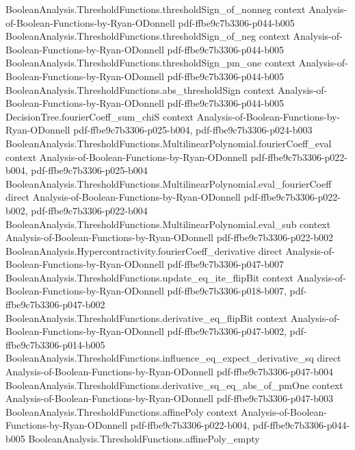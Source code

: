 \begin{theorem}
\proofstep
  {BooleanAnalysis.ThresholdFunctions.thresholdSign_of_nonneg}
  {context}
  {Analysis-of-Boolean-Functions-by-Ryan-ODonnell}
  {pdf-ffbe9c7b3306-p044-b005}
\proofstep
  {BooleanAnalysis.ThresholdFunctions.thresholdSign_of_neg}
  {context}
  {Analysis-of-Boolean-Functions-by-Ryan-ODonnell}
  {pdf-ffbe9c7b3306-p044-b005}
\proofstep
  {BooleanAnalysis.ThresholdFunctions.thresholdSign_pm_one}
  {context}
  {Analysis-of-Boolean-Functions-by-Ryan-ODonnell}
  {pdf-ffbe9c7b3306-p044-b005}
\proofstep
  {BooleanAnalysis.ThresholdFunctions.abs_thresholdSign}
  {context}
  {Analysis-of-Boolean-Functions-by-Ryan-ODonnell}
  {pdf-ffbe9c7b3306-p044-b005}
\proofstep
  {DecisionTree.fourierCoeff_sum_chiS}
  {context}
  {Analysis-of-Boolean-Functions-by-Ryan-ODonnell}
  {pdf-ffbe9c7b3306-p025-b004,
    pdf-ffbe9c7b3306-p024-b003}
\proofstep
  {BooleanAnalysis.ThresholdFunctions.MultilinearPolynomial.fourierCoeff_eval}
  {context}
  {Analysis-of-Boolean-Functions-by-Ryan-ODonnell}
  {pdf-ffbe9c7b3306-p022-b004,
    pdf-ffbe9c7b3306-p025-b004}
\proofstep
  {BooleanAnalysis.ThresholdFunctions.MultilinearPolynomial.eval_fourierCoeff}
  {direct}
  {Analysis-of-Boolean-Functions-by-Ryan-ODonnell}
  {pdf-ffbe9c7b3306-p022-b002,
    pdf-ffbe9c7b3306-p022-b004}
\proofstep
  {BooleanAnalysis.ThresholdFunctions.MultilinearPolynomial.eval_sub}
  {context}
  {Analysis-of-Boolean-Functions-by-Ryan-ODonnell}
  {pdf-ffbe9c7b3306-p022-b002}
\proofstep
  {BooleanAnalysis.Hypercontractivity.fourierCoeff_derivative}
  {direct}
  {Analysis-of-Boolean-Functions-by-Ryan-ODonnell}
  {pdf-ffbe9c7b3306-p047-b007}
\proofstep
  {BooleanAnalysis.ThresholdFunctions.update_eq_ite_flipBit}
  {context}
  {Analysis-of-Boolean-Functions-by-Ryan-ODonnell}
  {pdf-ffbe9c7b3306-p018-b007,
    pdf-ffbe9c7b3306-p047-b002}
\proofstep
  {BooleanAnalysis.ThresholdFunctions.derivative_eq_flipBit}
  {context}
  {Analysis-of-Boolean-Functions-by-Ryan-ODonnell}
  {pdf-ffbe9c7b3306-p047-b002,
    pdf-ffbe9c7b3306-p014-b005}
\proofstep
  {BooleanAnalysis.ThresholdFunctions.influence_eq_expect_derivative_sq}
  {direct}
  {Analysis-of-Boolean-Functions-by-Ryan-ODonnell}
  {pdf-ffbe9c7b3306-p047-b004}
\proofstep
  {BooleanAnalysis.ThresholdFunctions.derivative_sq_eq_abs_of_pmOne}
  {context}
  {Analysis-of-Boolean-Functions-by-Ryan-ODonnell}
  {pdf-ffbe9c7b3306-p047-b003}
\proofstep
  {BooleanAnalysis.ThresholdFunctions.affinePoly}
  {context}
  {Analysis-of-Boolean-Functions-by-Ryan-ODonnell}
  {pdf-ffbe9c7b3306-p022-b004,
    pdf-ffbe9c7b3306-p044-b005}
\proofstep
  {BooleanAnalysis.ThresholdFunctions.affinePoly_empty}

\end{theorem}
